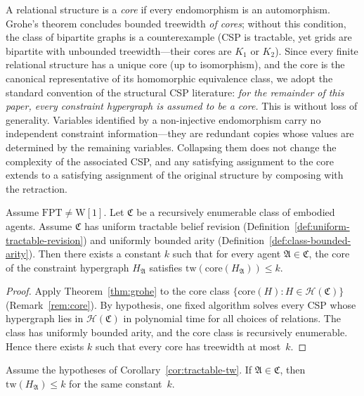 \documentclass[runningheads]{llncs}
\begin{document}
\begin{remark}\label{rem:core}
A relational structure is a \emph{core} if every endomorphism is an automorphism.
Grohe's theorem concludes bounded treewidth \emph{of cores}; without this condition, the class of bipartite graphs is a counterexample (CSP is tractable, yet grids are bipartite with unbounded treewidth---their cores are $K_1$ or $K_2$).
Since every finite relational structure has a unique core (up to isomorphism), and the core is the canonical representative of its homomorphic equivalence class, we adopt the standard convention of the structural CSP literature: \emph{for the remainder of this paper, every constraint hypergraph is assumed to be a core.}
This is without loss of generality.
Variables identified by a non-injective endomorphism carry no independent constraint information---they are redundant copies whose values are determined by the remaining variables.
Collapsing them does not change the complexity of the associated CSP, and any satisfying assignment to the core extends to a satisfying assignment of the original structure by composing with the retraction.
\end{remark}

\begin{corollary}\label{cor:tractable-tw}
Assume $\mathrm{FPT} \neq \mathrm{W}[1]$.
Let $\mathfrak{C}$ be a recursively enumerable class of embodied agents.
Assume $\mathfrak{C}$ has uniform tractable belief revision (Definition~\ref{def:uniform-tractable-revision}) and uniformly bounded arity (Definition~\ref{def:class-bounded-arity}).
Then there exists a constant $k$ such that for every agent $\mathfrak{A} \in \mathfrak{C}$, the core of the constraint hypergraph $H_{\mathfrak{A}}$ satisfies $\mathrm{tw}(\mathrm{core}(H_{\mathfrak{A}})) \leq k$.
\end{corollary}

\begin{proof}
Apply Theorem~\ref{thm:grohe} to the core class $\{\mathrm{core}(H) : H \in \mathcal{H}(\mathfrak{C})\}$ (Remark~\ref{rem:core}).
By hypothesis, one fixed algorithm solves every CSP whose hypergraph lies in $\mathcal{H}(\mathfrak{C})$ in polynomial time for all choices of relations.
The class has uniformly bounded arity, and the core class is recursively enumerable.
Hence there exists $k$ such that every core has treewidth at most~$k$.
\end{proof}

\begin{corollary}\label{cor:tractable-tw-instance}
Assume the hypotheses of Corollary~\ref{cor:tractable-tw}.
If $\mathfrak{A} \in \mathfrak{C}$, then $\mathrm{tw}(H_{\mathfrak{A}}) \leq k$ for the same constant~$k$.
\end{corollary}
\end{document}
